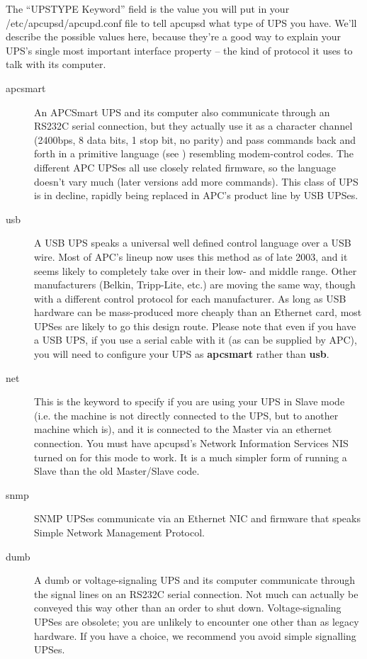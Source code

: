 \label{upstypes}
The ``UPSTYPE Keyword'' field is the value you will put in your
/etc/apcupsd/apcupd.conf file to tell apcupsd what type of UPS you have. 
We'll describe the possible values here, because they're a good way to explain
your UPS's single most important interface property {--} the kind of protocol
it uses to talk with its computer.  

\label{index-UPSTYPE-10}
\label{index-Keywords_002c-USBTYPE-11}

\begin{description}

\item [apcsmart]
   An APCSmart UPS and its computer also communicate through an RS232C serial
   connection, but they actually use it as a character channel (2400bps, 8 data
   bits, 1 stop bit, no parity) and pass commands back and forth in a primitive
   language (see 
   ) resembling   
   modem-control codes.  The different APC UPSes all use closely related
   firmware, so the language doesn't vary much (later versions add more
   commands).  This class of UPS is in decline, rapidly being replaced in APC's
   product line by USB UPSes.  

\item [usb]
   A USB UPS speaks a universal well defined control language over a USB wire. 
   Most of APC's lineup now uses this method as of late 2003, and it seems likely
   to completely take over in their low- and middle range.  Other manufacturers
   (Belkin, Tripp-Lite, etc.) are moving the same way, though with a different
   control protocol for each manufacturer.  As long as USB hardware can be
   mass-produced more cheaply than an Ethernet card, most UPSes are likely to go
   this design route. Please note that even if you have a USB UPS, if you use a
   serial cable with it (as can be supplied by APC), you will need to configure
   your UPS as {\bf apcsmart} rather than {\bf usb}.  

\item [net]
   This is the keyword to specify if you are using your UPS in Slave mode (i.e.
 the machine is not directly connected to the UPS, but to another machine which
 is), and it is connected to the Master via an ethernet connection. You must
 have apcupsd's Network Information Services NIS turned on for this mode to
 work. It is a much simpler form of running a Slave than the old Master/Slave
 code.  

\item [snmp]
   SNMP UPSes communicate via an Ethernet NIC and firmware that speaks Simple
Network Management Protocol.  

\item [dumb]
   A dumb or voltage-signaling UPS and its computer communicate through the
signal lines on an RS232C serial connection.  Not much can actually be
conveyed this way other than an order to shut down. Voltage-signaling UPSes
are obsolete; you are unlikely to encounter one other than as legacy hardware.
If you have a choice, we recommend you avoid simple signalling UPSes.  
\end{description}
